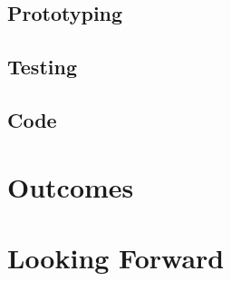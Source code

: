 \documentclass[nofonts,sfsidenotes]{tufte-book}
\begin{document}
		\section{Prototyping}\label{sec:prototyping}
			

		\section{Testing}\label{sec:testing}
			

		\section{Code}\label{sec:code}
			




	\chapter{Outcomes}\label{ch:outcomes}
		




	\chapter{Looking Forward}\label{ch:looking-forward}
		




	\backmatter
		
		
		
\end{document}
